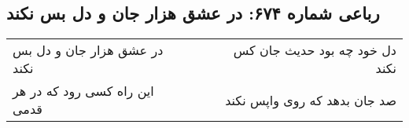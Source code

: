 \begin{center}
\section*{رباعی شماره ۶۷۴: در عشق هزار جان و دل بس نکند}
\label{sec:0674}
\begin{longtable}{l p{0.5cm} r}
در عشق هزار جان و دل بس نکند
&&
دل خود چه بود حدیث جان کس نکند
\\
این راه کسی رود که در هر قدمی
&&
صد جان بدهد که روی واپس نکند
\\
\end{longtable}
\end{center}
